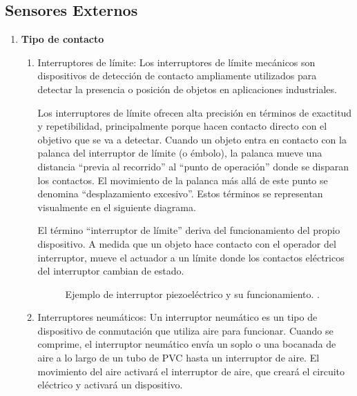 	\subsection{Sensores Externos}
	 \begin{enumerate}
		\item \textbf{Tipo de contacto}
		\begin{enumerate}
			\item Interruptores de límite: Los interruptores de límite mecánicos son dispositivos de detección de contacto ampliamente utilizados para detectar la presencia o posición de objetos en aplicaciones industriales.
			
			Los interruptores de límite ofrecen alta precisión en términos de exactitud y repetibilidad, principalmente porque hacen contacto directo con el objetivo que se va a detectar.  Cuando un objeto entra en contacto con la palanca del interruptor de límite (o émbolo), la palanca mueve una distancia “previa al recorrido” al “punto de operación” donde se disparan los contactos. El movimiento de la palanca más allá de este punto se denomina “desplazamiento excesivo”.  Estos términos se representan visualmente en el siguiente diagrama.
			
			El término “interruptor de límite” deriva del funcionamiento del propio dispositivo. A medida que un objeto hace contacto con el operador del interruptor, mueve el actuador a un límite donde los contactos eléctricos del interruptor cambian de estado. \cite{InterruptoresLimite}
			
			\begin{figure}[h]
				\centering
				\hspace{0.5cm} %
				\caption{Ejemplo de interruptor piezoeléctrico y su funcionamiento. \cite{InterruptoresdeLimite}.}
				\label{fig:PiezoeléctricoGeneral}
			\end{figure}
			
			\item Interruptores neumáticos: Un interruptor neumático es un tipo de dispositivo de conmutación que utiliza aire para funcionar. Cuando se comprime, el interruptor neumático envía un soplo o una bocanada de aire a lo largo de un tubo de PVC hasta un interruptor de aire. El movimiento del aire activará el interruptor de aire, que creará el circuito eléctrico y activará un dispositivo. \cite{Neumático}
			

\end{enumerate}
\end{enumerate}
